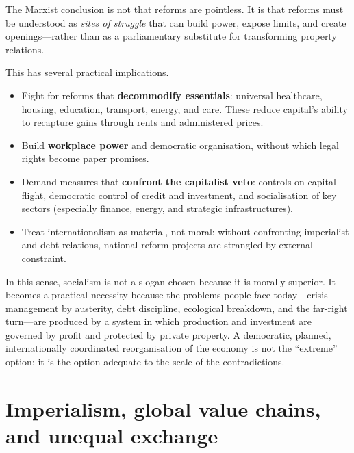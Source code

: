 The Marxist conclusion is not that reforms are pointless. It is that reforms must be understood as \emph{sites of struggle}
that can build power, expose limits, and create openings—rather than as a parliamentary substitute for transforming property
relations.

This has several practical implications.

\begin{itemize}[leftmargin=1.5em]
  \item Fight for reforms that \textbf{decommodify essentials}: universal healthcare, housing, education, transport, energy,
  and care. These reduce capital's ability to recapture gains through rents and administered prices.

  \item Build \textbf{workplace power} and democratic organisation, without which legal rights become paper promises.

  \item Demand measures that \textbf{confront the capitalist veto}: controls on capital flight, democratic control of credit
  and investment, and socialisation of key sectors (especially finance, energy, and strategic infrastructures).

  \item Treat internationalism as material, not moral: without confronting imperialist and debt relations, national reform
  projects are strangled by external constraint.
\end{itemize}

In this sense, socialism is not a slogan chosen because it is morally superior. It becomes a practical necessity because
the problems people face today—crisis management by austerity, debt discipline, ecological breakdown, and the far-right
turn—are produced by a system in which production and investment are governed by profit and protected by private property.
A democratic, planned, internationally coordinated reorganisation of the economy is not the ``extreme'' option; it is the
option adequate to the scale of the contradictions.

\setcounter{tocdepth}{2}

\section{Imperialism, global value chains, and unequal exchange}
\label{sec:imperialism}

